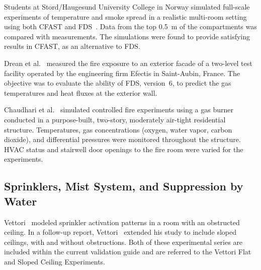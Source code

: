 Students at Stord/Haugesund University College in Norway simulated full-scale experiments of temperature and smoke spread in a
realistic multi-room setting using both CFAST and FDS~\cite{Storm:thesis}. Data from the top 0.5~m of the compartments was compared with measurements.
The simulations were found to provide satisfying results in CFAST, as an alternative to FDS.

Drean et al.~\cite{Drean2018} measured the fire exposure to an exterior facade of a two-level test facility operated by the engineering firm Efectis in Saint-Aubin, France. The objective was to evaluate the ability of FDS, version~6, to predict the gas temperatures and heat fluxes at the exterior wall.

Chaudhari et al.~\cite{Chaudhari:FT2023} simulated controlled fire experiments using a gas burner conducted in a purpose-built, two-story, moderately air-tight residential structure. Temperatures, gas concentrations (oxygen, water vapor, carbon dioxide), and differential pressures were monitored throughout the structure. HVAC status and stairwell door openings to the fire room were varied for the experiments.



\subsection{Sprinklers, Mist System, and Suppression by Water}

Vettori~\cite{Vettori:1} modeled sprinkler activation patterns in a room with an obstructed ceiling. In a follow-up report, Vettori~\cite{Vettori:2} extended his study to include sloped ceilings, with and without obstructions. Both of these experimental series are included within the current validation guide and are referred to the Vettori Flat and Sloped Ceiling Experiments.

